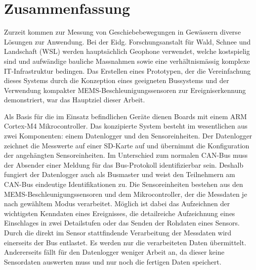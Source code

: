 %
%

\thispagestyle{empty}
\chapter*{Zusammenfassung}\label{chap.zusammenfassung}
Zurzeit kommen zur Messung von Geschiebebewegungen in Gewässern diverse Lösungen zur Anwendung. Bei der Eidg. Forschungsanstalt für Wald, Schnee und Landschaft (WSL) werden hauptsächlich Geophone verwendet, welche kostspielig sind und aufwändige bauliche Massnahmen sowie eine verhältnismässig komplexe IT-Infrastruktur bedingen. Das Erstellen eines Prototypen, der die Vereinfachung dieses Systems durch die Konzeption eines geeigneten Bussystems und der Verwendung kompakter MEMS-Beschleunigungssensoren zur Ereigniserkennung demonstriert, war das Hauptziel dieser Arbeit.

Als Basis für die im Einsatz befindlichen Geräte dienen Boards mit einem ARM Cortex-M4 Mikrocontroller. Das konzipierte System besteht im wesentlichen aus zwei Komponenten: einem Datenlogger und den Sensoreinheiten. Der Datenlogger zeichnet die Messwerte auf einer SD-Karte auf und übernimmt die Konfiguration der angehängten Sensoreinheiten. Im Unterschied zum normalen CAN-Bus muss der Absender einer Meldung für das Bus-Protokoll identifizierbar sein. Deshalb fungiert der Datenlogger auch als Busmaster und weist den Teilnehmern am CAN-Bus eindeutige Identifikationen zu. Die Sensoreinheiten bestehen aus den MEMS-Beschleunigungssensoren und dem Mikrocontroller, der die Messdaten je nach gewähltem Modus verarbeitet. Möglich ist dabei das Aufzeichnen der wichtigsten Kenndaten eines Ereignisses, die detailreiche Aufzeichnung eines Einschlages in zwei Detailstufen oder das Senden der Rohdaten eines Sensors. Durch die direkt im Sensor stattfindende Verarbeitung der Messdaten wird einerseits der Bus entlastet. Es werden nur die verarbeiteten Daten übermittelt. Andererseits fällt für den Datenlogger weniger Arbeit an, da dieser keine Sensordaten auswerten muss und nur noch die fertigen Daten speichert.

